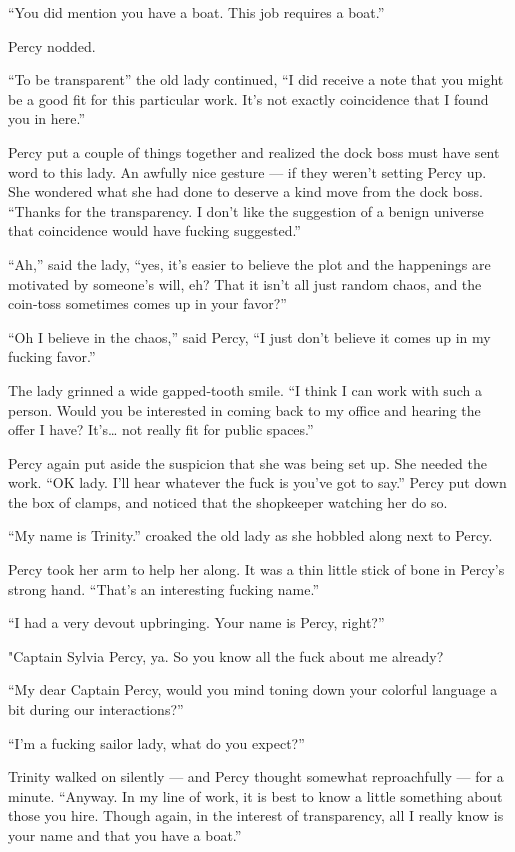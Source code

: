 \documentclass[]{scrbook}
\begin{document}
``You did mention you have a boat. This job requires a boat.''

Percy nodded.

``To be transparent'' the old lady continued, ``I did receive a note
that you might be a good fit for this particular work. It's not exactly
coincidence that I found you in here.''

Percy put a couple of things together and realized the dock boss must
have sent word to this lady. An awfully nice gesture --- if they weren't
setting Percy up. She wondered what she had done to deserve a kind move
from the dock boss. ``Thanks for the transparency. I don't like the
suggestion of a benign universe that coincidence would have fucking
suggested.''

``Ah,'' said the lady, ``yes, it's easier to believe the plot and the
happenings are motivated by someone's will, eh? That it isn't all just
random chaos, and the coin-toss sometimes comes up in your favor?''

``Oh I believe in the chaos,'' said Percy, ``I just don't believe it
comes up in my fucking favor.''

The lady grinned a wide gapped-tooth smile. ``I think I can work with
such a person. Would you be interested in coming back to my office and
hearing the offer I have? It's\ldots{} not really fit for public
spaces.''

Percy again put aside the suspicion that she was being set up. She
needed the work. ``OK lady. I'll hear whatever the fuck is you've got to
say.'' Percy put down the box of clamps, and noticed that the shopkeeper
watching her do so.

``My name is Trinity.'' croaked the old lady as she hobbled along next
to Percy.

Percy took her arm to help her along. It was a thin little stick of bone
in Percy's strong hand. ``That's an interesting fucking name.''

``I had a very devout upbringing. Your name is Percy, right?''

"Captain Sylvia Percy, ya. So you know all the fuck about me already?

``My dear Captain Percy, would you mind toning down your colorful
language a bit during our interactions?''

``I'm a fucking sailor lady, what do you expect?''

Trinity walked on silently --- and Percy thought somewhat reproachfully
--- for a minute. ``Anyway. In my line of work, it is best to know a
little something about those you hire. Though again, in the interest of
transparency, all I really know is your name and that you have a boat.''
\end{document}
